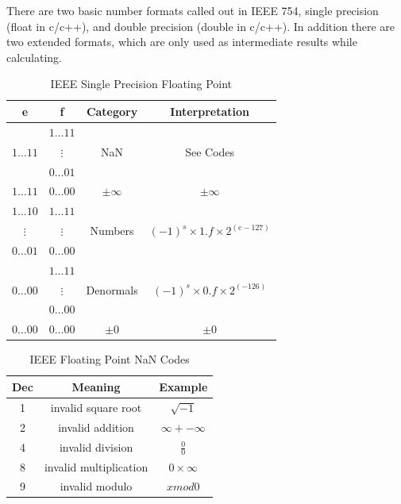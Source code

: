There are two basic number formats called out in IEEE 754, single precision (float in c/c++), and double precision (double in c/c++).  In addition there are two extended formats, which are only used as intermediate results while calculating.
\vspace{6pt}

\begin{table}
  \centering
  \caption{IEEE Single Precision Floating Point}\label{t-ieee-fp}

\begin{tabular}{|c|c|c|c|}
  \hline
   e & f & Category & Interpretation \\
  \hline
    & $1\ldots 11$ & &  \\
   $1\ldots 11$ & $\vdots$ & NaN & See Codes \\
    & $0\ldots 01$ & &  \\ \hline
   $1\ldots 11$ & $0\ldots 00$ & $\pm\infty$ & $\pm\infty$ \\ \hline
   $1\ldots 10$ & $1\ldots 11$ & &  \\
   $\vdots$ & $\vdots$ & Numbers & $(-1)^s\times 1.f \times 2^{(e-127)}$ \\
   $0\ldots 01$ & $0\ldots 00$ & &  \\ \hline
    & $1\ldots 11$ & &  \\
   $0\ldots 00$ & $\vdots$ & Denormals & $(-1)^s\times 0.f \times 2^{(-126)}$ \\
    & $0\ldots 00$ & &  \\ \hline
   $0\ldots 00$ & $0\ldots 00$ & $\pm 0$ & $\pm 0$ \\ \hline
\end{tabular}
\end{table}


\begin{table}
  \centering
  \caption{IEEE Floating Point NaN Codes}\label{t-ieee-fp-nan}

\begin{tabular}{|c|c|c|}
  \hline
  Dec & Meaning                & Example \\ \hline
  1   & invalid square root    & $\sqrt{-1}$ \\
  2   & invalid addition       & $\infty + -\infty$ \\
  4   & invalid division       & $\frac{0}{0}$ \\
  8   & invalid multiplication & $0\times\infty$ \\
  9   & invalid modulo         & $x mod 0$ \\
   \hline
\end{tabular}
\end{table}

